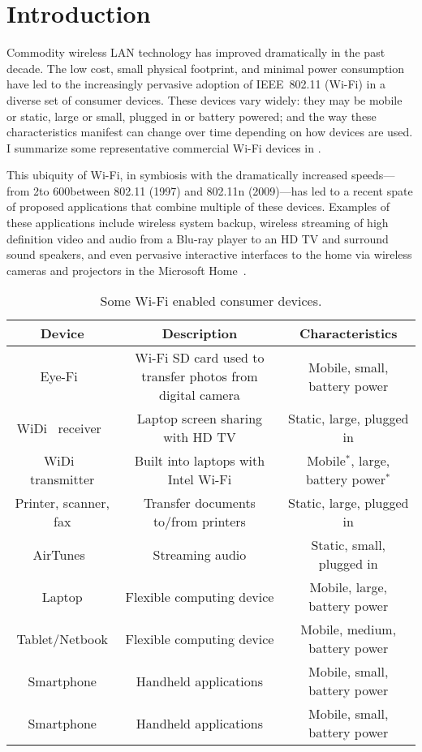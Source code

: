 \section{Introduction}
\label{sec:intro}

Commodity wireless LAN technology has improved dramatically in the past decade. The low cost, small physical footprint, and minimal power consumption have led to the increasingly pervasive adoption of IEEE~802.11 (Wi-Fi) in a diverse set of consumer devices. These devices vary widely: they may be mobile or static, large or small, plugged in or battery powered; and the way these characteristics manifest can change over time depending on how devices are used. I summarize some representative commercial Wi-Fi devices in .

This ubiquity of Wi-Fi, in symbiosis with the dramatically increased speeds---from 2\Mbps to 600\Mbps between 802.11 (1997) and 802.11n (2009)---has led to a recent spate of proposed applications that combine multiple of these devices. Examples of these applications include wireless system backup, wireless streaming of high definition video and audio from a Blu-ray player to an HD TV and surround sound speakers, and even pervasive interactive interfaces to the home via wireless cameras and projectors in the Microsoft Home~\cite{microsoft_home}.

\begin{table*}[ht]
\centering
\begin{tabulary}{\textwidth}{cCc}
\toprule
\bf Device & \bf Description & \bf Characteristics \\
\midrule
Eye-Fi~\cite{eyefi}  & Wi-Fi SD card used to transfer photos from digital camera & Mobile, small, battery power  \\
WiDi~\cite{widi} receiver~\cite{widi-rx}  & Laptop screen sharing with HD TV & Static, large, plugged in  \\
WiDi~\cite{widi} transmitter  & Built into laptops with Intel Wi-Fi & Mobile$^*$, large, battery power$^*$  \\
Printer, scanner, fax & Transfer documents to/from printers & Static, large, plugged in \\
AirTunes~\cite{airtunes} & Streaming audio & Static, small, plugged in \\
Laptop & Flexible computing device & Mobile, large, battery power \\
Tablet/Netbook & Flexible computing device & Mobile, medium, battery power \\
Smartphone & Handheld applications & Mobile, small, battery power \\
Smartphone & Handheld applications & Mobile, small, battery power \\
\bottomrule
\end{tabulary}
\label{tab:wifi-devices}
\caption{Some Wi-Fi enabled consumer devices.}
\end{table*}

